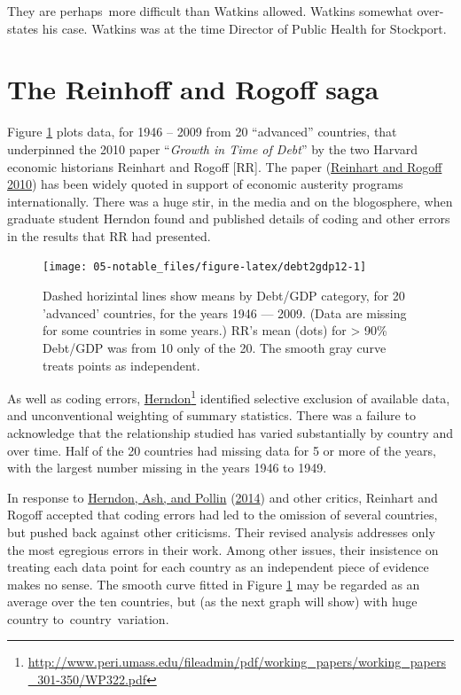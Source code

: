 \documentclass[
  10pt,
  b5paper]{book}
\begin{document}
They are perhaps~more difficult than Watkins allowed. Watkins
somewhat over-states his case. Watkins was at the time
Director of Public Health for Stockport.

\hypertarget{the-reinhoff-and-rogoff-saga}{%
\section{The Reinhoff and Rogoff saga}\label{the-reinhoff-and-rogoff-saga}}

Figure \ref{fig:debt2gdp12} plots data, for 1946 -- 2009
from 20 ``advanced'' countries, that underpinned the 2010
paper ``\emph{Growth in Time of Debt}'' by the two Harvard economic
historians Reinhart and Rogoff {[}RR{]}. The paper (\protect\hyperlink{ref-reinhart2010growth}{Reinhart and Rogoff 2010})
has been widely quoted in support of economic austerity programs
internationally. There was a huge stir, in the media and on the
blogosphere, when graduate student Herndon found and published
details of coding and other errors in the results that RR had
presented.

\begin{figure}[H]

{\centering \texttt{[image: 05-notable\_files/figure-latex/debt2gdp12-1]} 

}

\caption{Dashed horizintal lines show means by Debt/GDP category, 
for 20 'advanced' countries, for the years 1946 --- 2009.
(Data are missing for some countries in some years.)
RR's mean (dots) for > 90\% Debt/GDP was from 10 only of the 20. 
The smooth gray curve treats points as independent.}\label{fig:debt2gdp12}
\end{figure}

As well as coding errors,
\href{http://www.peri.umass.edu/fileadmin/pdf/working_papers/working_papers_301-350/WP322.pdf}{Herndon}\footnote{\url{http://www.peri.umass.edu/fileadmin/pdf/working_papers/working_papers_301-350/WP322.pdf}} identified selective exclusion of available data,
and unconventional weighting of summary statistics. There was a
failure to acknowledge that the relationship studied has varied
substantially by country and over time. Half of the 20 countries
had missing data for 5 or more of the years, with the largest
number missing in the years 1946 to 1949.

In response to \protect\hyperlink{ref-herndon2014does}{Herndon, Ash, and Pollin} (\protect\hyperlink{ref-herndon2014does}{2014}) and other critics, Reinhart and
Rogoff accepted that coding errors had led to the omission of
several countries, but pushed back against other criticisms.
Their revised analysis addresses only the most egregious errors
in their work. Among other issues, their insistence on treating
each data point for each country as an independent piece of
evidence makes no sense. The smooth curve fitted in Figure
\ref{fig:debt2gdp12} may be regarded as an average over the
ten countries, but (as the next graph will show) with huge country
to~country~variation.
\end{document}
